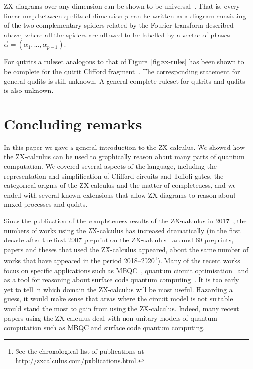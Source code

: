 \documentclass[a4paper,onecolumn,superscriptaddress,11pt,%
				unpublished,%
				allowfontchageintitle,%
				]{quantumarticle}
\begin{document}
ZX-diagrams over any dimension can be shown to be universal~\cite{wang2014qutrit}. That is, every linear map between qudits of dimension $p$ can be written as a diagram consisting of the two complementary spiders related by the Fourier transform described above, where all the spiders are allowed to be labelled by a vector of phases $\vec\alpha = (\alpha_1,\ldots,\alpha_{p-1})$.

For qutrits a ruleset analogous to that of Figure~\ref{fig:zx-rules} has been shown to be complete for the qutrit Clifford fragment~\cite{EPTCS266.3}. The corresponding statement for general qudits is still unknown. A general complete ruleset for qutrits and qudits is also unknown.

\section{Concluding remarks}

In this paper we gave a general introduction to the ZX-calculus.
We showed how the ZX-calculus can be used to graphically reason about many parts of quantum computation.
We covered several aspects of the language, including the representation and simplification of Clifford circuits and Toffoli gates, the categorical origins of the ZX-calculus and the matter of completeness, and we ended with several known extensions that allow ZX-diagrams to reason about mixed processes and qudits.

Since the publication of the completeness results of the ZX-calculus in 2017~\cite{HarnyAmarCompleteness,SimonCompleteness}, the numbers of works using the ZX-calculus has increased dramatically (in the first decade after the first 2007 preprint on the ZX-calculus~\cite{Coecke2007graphicalcalculus} around 60 preprints, papers and theses that used the ZX-calculus appeared, about the same number of works that have appeared in the period 2018--2020\footnote{See the chronological list of publications at \url{http://zxcalculus.com/publications.html}.}).
Many of the recent works focus on specific applications such as MBQC~\cite{kissinger2017MBQC,wetering-gflow}, quantum circuit optimisation~\cite{cliffsimp,deBeaudrap2020Techniques,kissinger2019tcount,phaseGadgetSynth} and as a tool for reasoning about surface code quantum computing~\cite{horsman2011quantum,deBeaudrap2020Paulifusion,Gidney2019efficientmagicstate,horsman2017surgery,hanks2019effective}. 
It is too early yet to tell in which domain the ZX-calculus will be most useful. Hazarding a guess, it would make sense that areas where the circuit model is not suitable would stand the most to gain from using the ZX-calculus. Indeed, many recent papers using the ZX-calculus deal with non-unitary models of quantum computation such as MBQC and surface code quantum computing.
\end{document}
